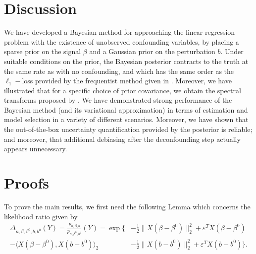 \documentclass[11pt]{article}
\newcommand{\eps}{\varepsilon}
\begin{document}

\section{Discussion}
We have developed a Bayesian method for approaching the linear regression problem with the existence of unobserved confounding variables, by placing a sparse prior on the signal $\beta$ and a Gaussian prior on the perturbation $b$. Under suitable conditions on the prior, the Bayesian posterior contracts to the truth at the same rate as with no confounding, and which has the same order as the $\ell_1-$loss provided by the frequentist method given in \cite{CBM2020}. Moreover, we have illustrated that for a specific choice of prior covariance, we obtain the spectral transforms proposed by \cite{CBM2020}. We have demonstrated strong performance of the Bayesian method (and its variational approximation) in terms of estimation and model selection in a variety of different scenarios. Moreover, we have shown that the out-of-the-box uncertainty quantification provided by the posterior is reliable; and moreover, that additional debiasing after the deconfounding step actually appears unnecessary.




\appendix
\newpage
\section{Proofs}
To prove the main results, we first need the following Lemma which concerns the likelihood ratio given by
\begin{align*}
	\Delta_{n, \beta, \beta^0, b, b^0}(Y) = \frac{p_{n, \beta, b}}{p_{n, \beta^0, b^0}}(Y) = \exp\Big\{&-\frac{1}{2}\|X(\beta - \beta^0)\|_2^2 + \eps^TX(\beta - \beta^0) \\
 -\langle X(\beta - \beta^0), X(b - b^0)  \rangle_2	&-\frac{1}{2}\|X(b - b^0)\|_2^2 + \eps^TX(b - b^0) \Big\}.
\end{align*}
\end{document}
